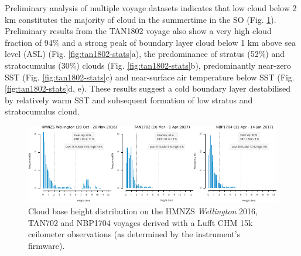 Preliminary analysis of multiple voyage datasets indicates that low cloud
below 2 km constitutes the majority of cloud in the summertime in the SO
(Fig. \ref{fig:cbh}). Preliminary results from the TAN1802 voyage also
show a very high cloud fraction of 94\% and a strong peak of boundary layer
cloud below 1 km above sea level (ASL) (Fig. \ref{fig:tan1802-stats}a), the predominance
of stratus (52\%) and stratocumulus (30\%) clouds (Fig. \ref{fig:tan1802-stats}b), predominantly
near-zero SST (Fig. \ref{fig:tan1802-stats}c) and near-surface air temperature below SST
(Fig. \ref{fig:tan1802-stats}d, e). These results suggest a cold boundary layer
destabilised by relatively warm SST and subsequent formation of
low stratus and stratocumulus cloud.

\begin{figure}[t]
\includegraphics[width=\textwidth]{fig/cbh.pdf}
\caption[Cloud base height distribution]{
Cloud base height distribution on the HMNZS \textit{Wellington} 2016, TAN702 and NBP1704
voyages derived with a Lufft CHM 15k ceilometer observations (as determined by
the instrument's firmware).
}
\label{fig:cbh}
\end{figure}

